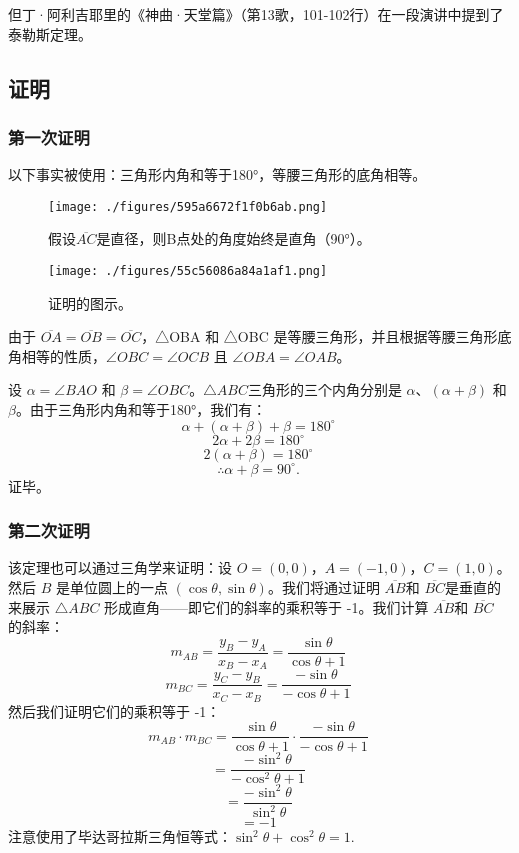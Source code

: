 但丁·阿利吉耶里的《神曲·天堂篇》（第13歌，101-102行）在一段演讲中提到了泰勒斯定理。
\subsection{证明}  
\subsubsection{第一次证明}  
以下事实被使用：三角形内角和等于180°，等腰三角形的底角相等。
\begin{figure}[ht]
\centering
\texttt{[image: ./figures/595a6672f1f0b6ab.png]}
\caption{假设\(\overline{AC}\)是直径，则B点处的角度始终是直角（90°）。} \label{fig_Thales_3}
\end{figure}
\begin{figure}[ht]
\centering
\texttt{[image: ./figures/55c56086a84a1af1.png]}
\caption{证明的图示。} \label{fig_Thales_4}
\end{figure}
由于 \(\overline{OA} = \overline{OB} = \overline{OC}\)，△OBA 和 △OBC 是等腰三角形，并且根据等腰三角形底角相等的性质，\(\angle OBC= \angle OCB\) 且 \(\angle OBA = \angle OAB\)。

设 \(\alpha = \angle BAO\) 和 \(\beta = \angle OBC\)。\(\triangle ABC\)三角形的三个内角分别是 \(\alpha\)、\((\alpha + \beta)\) 和 \(\beta\)。由于三角形内角和等于180°，我们有：
\[
\alpha + (\alpha + \beta) + \beta = 180^\circ~
\]
\[
2\alpha + 2\beta = 180^\circ~
\]
\[
2(\alpha + \beta) = 180^\circ~
\]
\[
\therefore \alpha + \beta = 90^\circ.~
\]
证毕。
\subsubsection{第二次证明}  
该定理也可以通过三角学来证明：设 \( O = (0, 0) \)，\( A = (-1, 0) \)，\( C = (1, 0) \)。然后 \( B \) 是单位圆上的一点 \((\cos \theta, \sin \theta)\)。我们将通过证明 \(\overline{AB}\)和 \(\overline{BC}\)是垂直的来展示 \(\triangle ABC\) 形成直角——即它们的斜率的乘积等于 -1。我们计算 \(\overline{AB}\)和 \(\overline{BC}\) 的斜率：
\[
m_{AB} = \frac{y_B - y_A}{x_B - x_A} = \frac{\sin \theta}{\cos \theta + 1}~
\]
\[
m_{BC} = \frac{y_C - y_B}{x_C - x_B} = \frac{-\sin \theta}{-\cos \theta + 1}~
\]
然后我们证明它们的乘积等于 -1：
\[
m_{AB} \cdot m_{BC} = \frac{\sin \theta}{\cos \theta + 1} \cdot \frac{-\sin \theta}{-\cos \theta + 1}~
\]
\[
= \frac{-\sin^2 \theta}{-\cos^2 \theta + 1}~
\]
\[
= \frac{-\sin^2 \theta}{\sin^2 \theta}~
\]
\[
= -1~
\]
注意使用了毕达哥拉斯三角恒等式：\(\sin^2 \theta + \cos^2 \theta = 1\).
